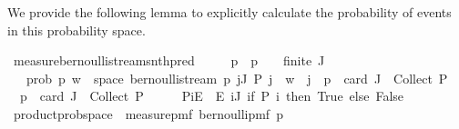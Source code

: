 \begin{isabellebody}
\endisatagproof
{\isafoldproof}%
%
\isadelimproof
%
\endisadelimproof
%
\begin{isamarkuptext}%
We provide the following lemma to explicitly calculate the probability of events in this probability space.%
\end{isamarkuptext}\isamarkuptrue%
\isamarkupfalse%
\ measure{\isacharunderscore}{\kern0pt}bernoulli{\isacharunderscore}{\kern0pt}stream{\isacharunderscore}{\kern0pt}snth{\isacharunderscore}{\kern0pt}pred{\isacharcolon}{\kern0pt}\isanewline
\ \ \ {\isachardoublequoteopen}{}\ {\isasymle}\ p{\isachardoublequoteclose}\ \ {\isachardoublequoteopen}p\ {\isasymle}\ {}{\isachardoublequoteclose}\ \ {\isachardoublequoteopen}finite\ J{\isachardoublequoteclose}\ \isanewline
\ \ \ {\isachardoublequoteopen}prob\ p\ {\isacharbraceleft}{\kern0pt}w\ {\isasymin}\ space\ {\isacharparenleft}{\kern0pt}bernoulli{\isacharunderscore}{\kern0pt}stream\ p{\isacharparenright}{\kern0pt}{\isachardot}{\kern0pt}\ {\isasymforall}j{\isasymin}J{\isachardot}{\kern0pt}\ P\ j\ {\isacharequal}{\kern0pt}\ w\ {\isacharbang}{\kern0pt}{\isacharbang}{\kern0pt}\ j{\isacharbraceright}{\kern0pt}\ {\isacharequal}{\kern0pt}\ p\ {\isacharcircum}{\kern0pt}\ card\ {\isacharparenleft}{\kern0pt}J\ {\isasyminter}\ Collect\ P{\isacharparenright}{\kern0pt}\ {\isacharasterisk}{\kern0pt}\ {\isacharparenleft}{\kern0pt}{}\ {\isacharminus}{\kern0pt}\ p{\isacharparenright}{\kern0pt}\ {\isacharcircum}{\kern0pt}\ {\isacharparenleft}{\kern0pt}card\ {\isacharparenleft}{\kern0pt}J\ {\isacharminus}{\kern0pt}\ Collect\ P{\isacharparenright}{\kern0pt}{\isacharparenright}{\kern0pt}{\isachardoublequoteclose}\isanewline
%
\isadelimproof
%
\endisadelimproof
%
\isatagproof
{}\isamarkupfalse%
\ {\isacharminus}{\kern0pt}\isanewline
\ \ \isamarkupfalse%
\ {\isacharquery}{\kern0pt}PiE\ {\isacharequal}{\kern0pt}\ {\isachardoublequoteopen}{\isacharparenleft}{\kern0pt}{\isasymPi}\isactrlsub E\ i{\isasymin}J{\isachardot}{\kern0pt}\ if\ P\ i\ then\ {\isacharbraceleft}{\kern0pt}True{\isacharbraceright}{\kern0pt}\ else\ {\isacharbraceleft}{\kern0pt}False{\isacharbraceright}{\kern0pt}{\isacharparenright}{\kern0pt}{\isachardoublequoteclose}\isanewline
\ \ \isamarkupfalse%
\ {\isachardoublequoteopen}product{\isacharunderscore}{\kern0pt}prob{\isacharunderscore}{\kern0pt}space\ {\isacharparenleft}{\kern0pt}{\isasymlambda}{\isacharunderscore}{\kern0pt}{\isachardot}{\kern0pt}\ measure{\isacharunderscore}{\kern0pt}pmf\ {\isacharparenleft}{\kern0pt}bernoulli{\isacharunderscore}{\kern0pt}pmf\ p{\isacharparenright}{\kern0pt}{\isacharparenright}{\kern0pt}{\isachardoublequoteclose}\ \isamarkupfalse%

\end{isabellebody}
